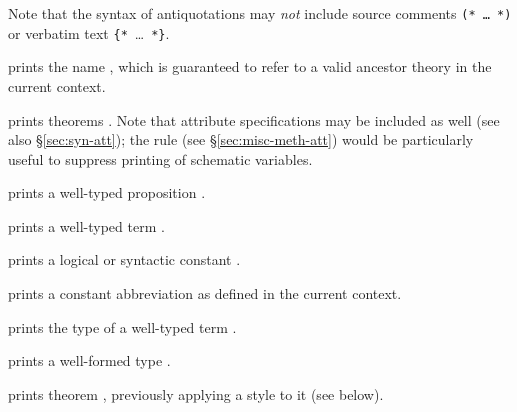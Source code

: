 \begin{isabellebody}
\begin{isamarkuptext}
  Note that the syntax of antiquotations may \emph{not} include source
  comments \texttt{(*~\dots~*)} or verbatim text
  \verb|{*|~\dots~\verb|*|\verb|}|.

  \begin{descr}
  
  \item [\isa{{\isacharat}{\isacharbraceleft}theory\ A{\isacharbraceright}}] prints the name , which is
  guaranteed to refer to a valid ancestor theory in the current
  context.

  \item [\isa{{\isacharat}{\isacharbraceleft}thm\ a\isactrlsub {\isadigit{1}}\ {\isasymdots}\ a\isactrlsub n{\isacharbraceright}}] prints theorems .  Note that attribute specifications may be
  included as well (see also \S\ref{sec:syn-att}); the  rule (see \S\ref{sec:misc-meth-att}) would be particularly
  useful to suppress printing of schematic variables.

  \item [\isa{{\isacharat}{\isacharbraceleft}prop\ {\isasymphi}{\isacharbraceright}}] prints a well-typed proposition \isa{{\isasymphi}}.

  \item [\isa{{\isacharat}{\isacharbraceleft}term\ t{\isacharbraceright}}] prints a well-typed term .

  \item [\isa{{\isacharat}{\isacharbraceleft}const\ c{\isacharbraceright}}] prints a logical or syntactic constant
  .
  
  \item [\isa{{\isacharat}{\isacharbraceleft}abbrev\ c\ x\isactrlsub {\isadigit{1}}\ {\isasymdots}\ x\isactrlsub n{\isacharbraceright}}] prints a constant
  abbreviation  as defined in
  the current context.

  \item [\isa{{\isacharat}{\isacharbraceleft}typeof\ t{\isacharbraceright}}] prints the type of a well-typed term
  .

  \item [\isa{{\isacharat}{\isacharbraceleft}typ\ {\isasymtau}{\isacharbraceright}}] prints a well-formed type \isa{{\isasymtau}}.
  
  \item [\isa{{\isacharat}{\isacharbraceleft}thm{\isacharunderscore}style\ s\ a{\isacharbraceright}}] prints theorem ,
  previously applying a style  to it (see below).
  

\end{descr}
\end{isamarkuptext}
\end{isabellebody}
